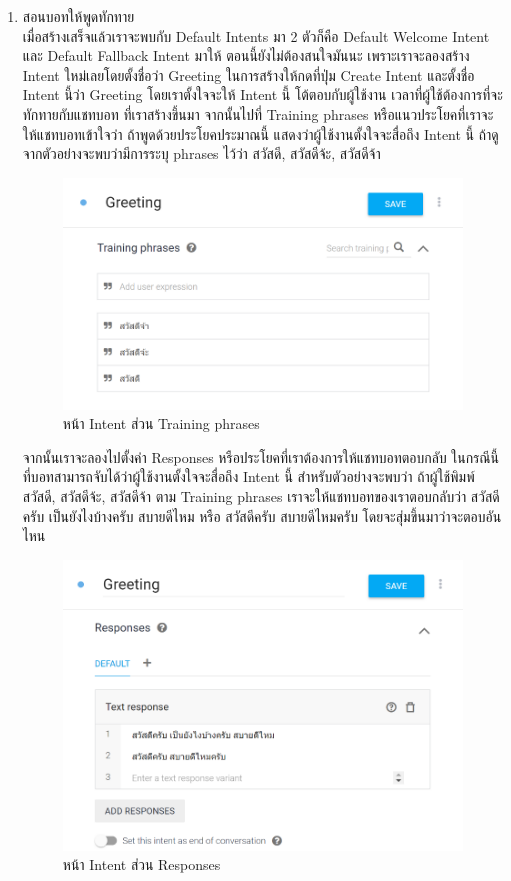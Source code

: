 \begin{enumerate}[label=\arabic*)]
\item สอนบอทให้พูดทักทาย \\
เมื่อสร้างเสร็จแล้วเราจะพบกับ Default Intents มา 2 ตัวก็คือ Default Welcome Intent และ Default Fallback Intent มาให้ ตอนนี้ยังไม่ต้องสนใจมันนะ เพราะเราจะลองสร้าง Intent ใหม่เลยโดยตั้งชื่อว่า Greeting 
ในการสร้างให้กดที่ปุ่ม Create Intent และตั้งชื่อ Intent นี้ว่า Greeting โดยเราตั้งใจจะให้ Intent นี้ โต้ตอบกับผู้ใช้งาน เวลาที่ผู้ใช้ต้องการที่จะทักทายกับแชทบอท ที่เราสร้างขึ้นมา
จากนั้นไปที่ Training phrases หรือแนวประโยคที่เราจะให้แชทบอทเข้าใจว่า ถ้าพูดด้วยประโยคประมาณนี้ แสดงว่าผู้ใช้งานตั้งใจจะสื่อถึง Intent นี้ ถ้าดูจากตัวอย่างจะพบว่ามีการระบุ phrases ไว้ว่า สวัสดี, สวัสดีจ้ะ, สวัสดีจ้า

	\begin{figure}[H]
		\centering
		\includegraphics[width=0.9\columnwidth]{Figures/2/dialogflow_3}
		\caption{หน้า Intent ส่วน Training phrases}
		\label{Fig:dialogflow3}
	\end{figure}
	
จากนั้นเราจะลองไปตั้งค่า Responses หรือประโยคที่เราต้องการให้แชทบอทตอบกลับ ในกรณีนี้ที่บอทสามารถจับได้ว่าผู้ใช้งานตั้งใจจะสื่อถึง Intent นี้ สำหรับตัวอย่างจะพบว่า ถ้าผู้ใช้พิมพ์ สวัสดี, สวัสดีจ้ะ, สวัสดีจ้า ตาม Training phrases เราจะให้แชทบอทของเราตอบกลับว่า สวัสดีครับ เป็นยังไงบ้างครับ สบายดีไหม หรือ สวัสดีครับ สบายดีไหมครับ โดยจะสุ่มขึ้นมาว่าจะตอบอันไหน
	
	\begin{figure}[H]
		\centering
		\includegraphics[width=0.9\columnwidth]{Figures/2/dialogflow_4}
		\caption{หน้า Intent ส่วน Responses}
		\label{Fig:dialogflow4}
	\end{figure}



\end{enumerate}
